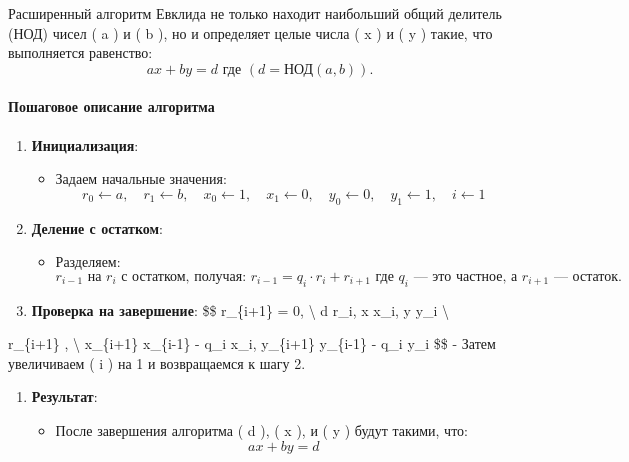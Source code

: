 \documentclass[
]{article}
\providecommand{\tightlist}{%
  \setlength{\itemsep}{0pt}\setlength{\parskip}{0pt}}
\begin{document}
Расширенный алгоритм Евклида не только находит наибольший общий делитель
(НОД) чисел ( a ) и ( b ), но и определяет целые числа ( x ) и ( y )
такие, что выполняется равенство: \[
ax + by = d \text{ где } ( d = \text{НОД}(a, b) ).
\]

\paragraph{Пошаговое описание
алгоритма}\label{ux43fux43eux448ux430ux433ux43eux432ux43eux435-ux43eux43fux438ux441ux430ux43dux438ux435-ux430ux43bux433ux43eux440ux438ux442ux43cux430-1}

\begin{enumerate}
\def\labelenumi{\arabic{enumi}.}
\tightlist
\item
  \textbf{Инициализация}:

  \begin{itemize}
  \tightlist
  \item
    Задаем начальные значения: \[
    r_0 \leftarrow a, \quad r_1 \leftarrow b, \quad x_0 \leftarrow 1, \quad x_1 \leftarrow 0, \quad y_0 \leftarrow 0, \quad y_1 \leftarrow 1, \quad i \leftarrow 1
    \]
  \end{itemize}
\item
  \textbf{Деление с остатком}:

  \begin{itemize}
  \tightlist
  \item
    Разделяем: \[ 
     r_{i-1}  \text{ на }  r_i  \text{ с остатком, получая: }
     r_{i-1} = q_i \cdot r_i + r_{i+1}
     \text{ где }  q_i  \text{ — это частное, а }  r_{i+1}  \text{ — остаток.}
     \]
  \end{itemize}
\item
  \textbf{Проверка на завершение}: \$\$  r\_\{i+1\} = 0,
   \textbackslash{} d \leftarrow r\_i, \quad x
  \leftarrow x\_i, \quad y \leftarrow y\_i \textbackslash{}
\end{enumerate}

 r\_\{i+1\} ,
 \textbackslash{} x\_\{i+1\}
\leftarrow x\_\{i-1\} - q\_i \cdot x\_i, \quad y\_\{i+1\}
\leftarrow y\_\{i-1\} - q\_i \cdot y\_i \$\$ - Затем увеличиваем ( i )
на 1 и возвращаемся к шагу 2.

\begin{enumerate}
\def\labelenumi{\arabic{enumi}.}
\setcounter{enumi}{1}
\tightlist
\item
  \textbf{Результат}:

  \begin{itemize}
  \tightlist
  \item
    После завершения алгоритма ( d ), ( x ), и ( y ) будут такими, что:
    \[
    ax + by = d
    \]
  \end{itemize}
\end{enumerate}
\end{document}
